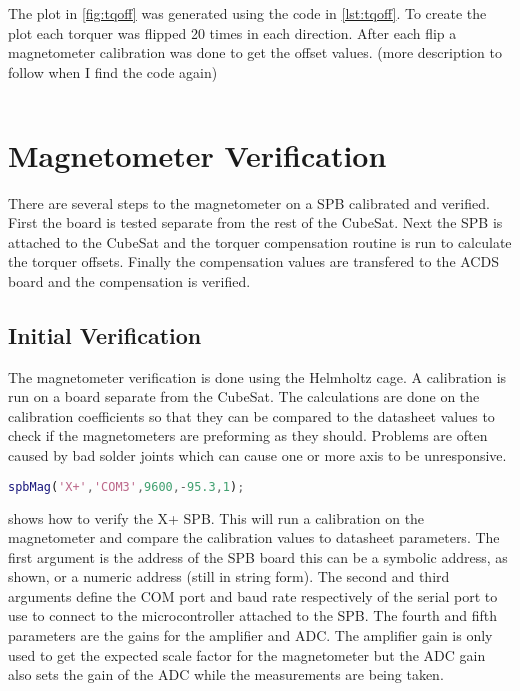 The plot in \cref{fig:tqoff} was generated using the code in \cref{lst:tqoff}. To create the plot each torquer was flipped 20 times in each direction. After each flip a magnetometer calibration was done to get the offset values. (more description to follow when I find the code again)

\begin{lstlisting}[style=code,caption={Code to measure torquer repeatibility for the Y+ axis},label={lst:tqoff},language=Matlab]
%TODO: find the code that I used to make the plot...
\end{lstlisting}


\section{Magnetometer Verification}

There are several steps to the magnetometer on a \ac{SPB} calibrated and verified. First the board is tested separate from the rest of the CubeSat. Next the \ac{SPB} is attached to the CubeSat and the torquer compensation routine is run to calculate the torquer offsets. Finally the compensation values are transfered to the \ac{ACDS} board and the compensation is verified.


\subsection{Initial Verification}

The magnetometer verification is done using the Helmholtz cage. A calibration is run on a board separate from the CubeSat. The calculations are done on the calibration coefficients so that they can be compared to the datasheet values to check if the magnetometers are preforming as they should. Problems are often caused by bad solder joints which can cause one or more axis to be unresponsive.

\begin{lstlisting}[style=code,caption={\ac{SPB} verification},label={lst:vspb},language=Matlab]
spbMag('X+','COM3',9600,-95.3,1);
\end{lstlisting}

 shows how to verify the X+ \ac{SPB}. This will run a calibration on the magnetometer and compare the calibration values to datasheet parameters. The first argument is the address of the \ac{SPB} board this can be a symbolic address, as shown, or a numeric address (still in string form). The second and third arguments define the COM port and baud rate respectively of the serial port to use to connect to the microcontroller attached to the \ac{SPB}. The fourth and fifth parameters are the gains for the amplifier and \ac{ADC}. The amplifier gain is only used to get the expected scale factor for the magnetometer but the \ac{ADC} gain also sets the gain of the \ac{ADC} while the measurements are being taken.

